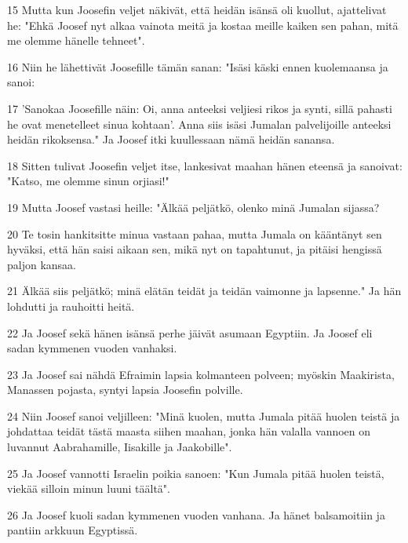 \par 15 Mutta kun Joosefin veljet näkivät, että heidän isänsä oli kuollut, ajattelivat he: "Ehkä Joosef nyt alkaa vainota meitä ja kostaa meille kaiken sen pahan, mitä me olemme hänelle tehneet".
\par 16 Niin he lähettivät Joosefille tämän sanan: "Isäsi käski ennen kuolemaansa ja sanoi:
\par 17 'Sanokaa Joosefille näin: Oi, anna anteeksi veljiesi rikos ja synti, sillä pahasti he ovat menetelleet sinua kohtaan'. Anna siis isäsi Jumalan palvelijoille anteeksi heidän rikoksensa." Ja Joosef itki kuullessaan nämä heidän sanansa.
\par 18 Sitten tulivat Joosefin veljet itse, lankesivat maahan hänen eteensä ja sanoivat: "Katso, me olemme sinun orjiasi!"
\par 19 Mutta Joosef vastasi heille: "Älkää peljätkö, olenko minä Jumalan sijassa?
\par 20 Te tosin hankitsitte minua vastaan pahaa, mutta Jumala on kääntänyt sen hyväksi, että hän saisi aikaan sen, mikä nyt on tapahtunut, ja pitäisi hengissä paljon kansaa.
\par 21 Älkää siis peljätkö; minä elätän teidät ja teidän vaimonne ja lapsenne." Ja hän lohdutti ja rauhoitti heitä.
\par 22 Ja Joosef sekä hänen isänsä perhe jäivät asumaan Egyptiin. Ja Joosef eli sadan kymmenen vuoden vanhaksi.
\par 23 Ja Joosef sai nähdä Efraimin lapsia kolmanteen polveen; myöskin Maakirista, Manassen pojasta, syntyi lapsia Joosefin polville.
\par 24 Niin Joosef sanoi veljilleen: "Minä kuolen, mutta Jumala pitää huolen teistä ja johdattaa teidät tästä maasta siihen maahan, jonka hän valalla vannoen on luvannut Aabrahamille, Iisakille ja Jaakobille".
\par 25 Ja Joosef vannotti Israelin poikia sanoen: "Kun Jumala pitää huolen teistä, viekää silloin minun luuni täältä".
\par 26 Ja Joosef kuoli sadan kymmenen vuoden vanhana. Ja hänet balsamoitiin ja pantiin arkkuun Egyptissä.


